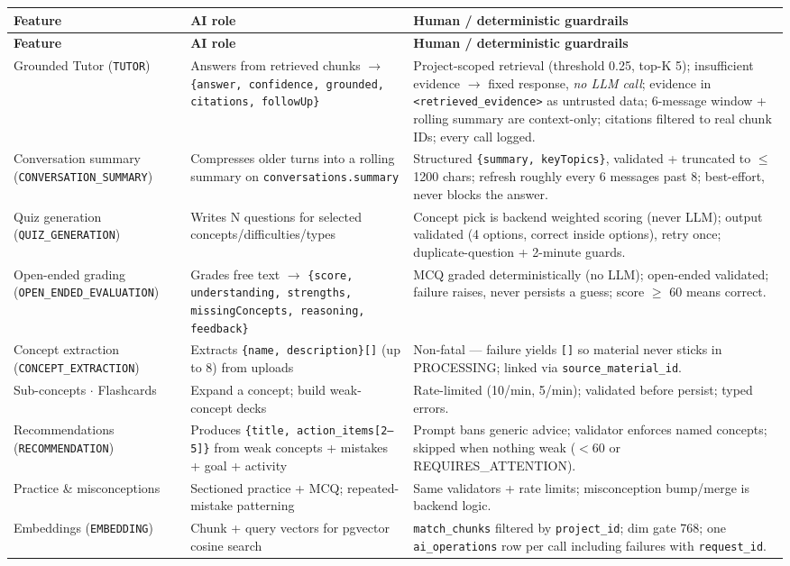 \documentclass[11pt,a4paper]{article}
\begin{document}
\begin{longtable}{p{3.2cm}p{4.6cm}p{7.1cm}}
\toprule
\textbf{Feature} & \textbf{AI role} & \textbf{Human / deterministic guardrails} \\
\midrule
\endfirsthead
\toprule
\textbf{Feature} & \textbf{AI role} & \textbf{Human / deterministic guardrails} \\
\midrule
\endhead
Grounded Tutor (\texttt{TUTOR}) &
Answers from retrieved chunks $\rightarrow$ \texttt{\{answer, confidence, grounded, citations, followUp\}} &
Project-scoped retrieval (threshold 0.25, top-K 5); insufficient evidence $\rightarrow$ fixed response, \textit{no LLM call}; evidence in \texttt{<retrieved\_evidence>} as untrusted data; 6-message window + rolling summary are context-only; citations filtered to real chunk IDs; every call logged. \\
\midrule
Conversation summary (\texttt{CONVERSATION\_SUMMARY}) &
Compresses older turns into a rolling summary on \texttt{conversations.summary} &
Structured \texttt{\{summary, keyTopics\}}, validated + truncated to $\leq$1200 chars; refresh roughly every 6 messages past 8; best-effort, never blocks the answer. \\
\midrule
Quiz generation (\texttt{QUIZ\_GENERATION}) &
Writes N questions for selected concepts/difficulties/types &
Concept pick is backend weighted scoring (never LLM); output validated (4 options, correct inside options), retry once; duplicate-question + 2-minute guards. \\
\midrule
Open-ended grading (\texttt{OPEN\_ENDED\_EVALUATION}) &
Grades free text $\rightarrow$ \texttt{\{score, understanding, strengths, missingConcepts, reasoning, feedback\}} &
MCQ graded deterministically (no LLM); open-ended validated; failure raises, never persists a guess; score $\geq$ 60 means correct. \\
\midrule
Concept extraction (\texttt{CONCEPT\_EXTRACTION}) &
Extracts \texttt{\{name, description\}[]} (up to 8) from uploads &
Non-fatal --- failure yields \texttt{[]} so material never sticks in PROCESSING; linked via \texttt{source\_material\_id}. \\
\midrule
Sub-concepts $\cdot$ Flashcards &
Expand a concept; build weak-concept decks &
Rate-limited (10/min, 5/min); validated before persist; typed errors. \\
\midrule
Recommendations (\texttt{RECOMMENDATION}) &
Produces \texttt{\{title, action\_items[2--5]\}} from weak concepts + mistakes + goal + activity &
Prompt bans generic advice; validator enforces named concepts; skipped when nothing weak ($<$60 or REQUIRES\_ATTENTION). \\
\midrule
Practice \& misconceptions &
Sectioned practice + MCQ; repeated-mistake patterning &
Same validators + rate limits; misconception bump/merge is backend logic. \\
\midrule
Embeddings (\texttt{EMBEDDING}) &
Chunk + query vectors for pgvector cosine search &
\texttt{match\_chunks} filtered by \texttt{project\_id}; dim gate 768; one \texttt{ai\_operations} row per call including failures with \texttt{request\_id}. \\
\bottomrule
\end{longtable}
\end{document}
